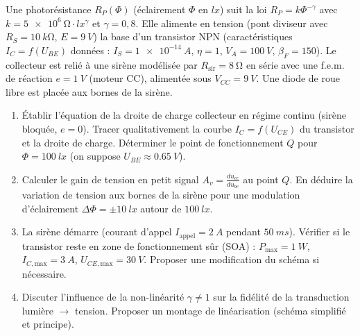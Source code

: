 \documentclass[11pt]{article}
\begin{document}
\begin{exercice}
Une photorésistance $R_P(\Phi)$ (éclairement $\Phi$ en $\si{lx}$) suit la loi $R_P = k \Phi^{-\gamma}$ avec $k = \SI{5e6}{\ohm \cdot lx^{\gamma}}$ et $\gamma = 0,8$. Elle alimente en tension (pont diviseur avec $R_S = \SI{10}{k\ohm}$, $E = \SI{9}{V}$) la base d'un transistor NPN (caractéristiques $I_C = f(U_{BE})$ données : $I_S = \SI{1e-14}{A}$, $\eta = 1$, $V_A = \SI{100}{V}$, $\beta_F = 150$). Le collecteur est relié à une sirène modélisée par $R_{\text{sir}} = \SI{8}{\ohm}$ en série avec une f.e.m. de réaction $e = \SI{1}{V}$ (moteur CC), alimentée sous $V_{CC} = \SI{9}{V}$. Une diode de roue libre est placée aux bornes de la sirène.
\begin{enumerate}
    \item Établir l'équation de la droite de charge collecteur en régime continu (sirène bloquée, $e=0$). Tracer qualitativement la courbe $I_C = f(U_{CE})$ du transistor et la droite de charge. Déterminer le point de fonctionnement $Q$ pour $\Phi = \SI{100}{lx}$ (on suppose $U_{BE} \approx \SI{0,65}{V}$).
    \item Calculer le gain de tension en petit signal $A_v = \frac{d u_{ce}}{d u_{be}}$ au point $Q$. En déduire la variation de tension aux bornes de la sirène pour une modulation d'éclairement $\Delta \Phi = \pm \SI{10}{lx}$ autour de $\SI{100}{lx}$.
    \item La sirène démarre (courant d'appel $I_{\text{appel}} = \SI{2}{A}$ pendant $\SI{50}{ms}$). Vérifier si le transistor reste en zone de fonctionnement sûr (SOA) : $P_{\text{max}} = \SI{1}{W}$, $I_{C,\text{max}} = \SI{3}{A}$, $U_{CE,\text{max}} = \SI{30}{V}$. Proposer une modification du schéma si nécessaire.
    \item Discuter l'influence de la non-linéarité $\gamma \neq 1$ sur la fidélité de la transduction lumière $\to$ tension. Proposer un montage de linéarisation (schéma simplifié et principe).
\end{enumerate}
\end{exercice}
\end{document}
